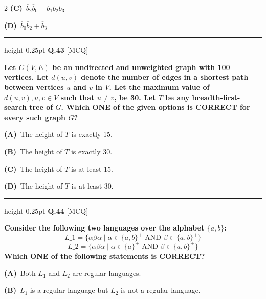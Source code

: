 \documentclass[a4paper,10pt,twoside]{article}
\begin{document}
\begin{multicols}{2}
\textbf{(C)}~$\overline{b}_2\overline{b}_0 + b_1b_2b_3$\par\vspace{2pt}\noindent
\textbf{(D)}~$\overline{b}_0\overline{b}_2 + \overline{b}_3$
\par\vspace{6pt}\hrule height 0.25pt\vspace{6pt}
\noindent\textbf{Q.43} \hfill {\footnotesize\textsf{[MCQ]}}
\par\vspace{2pt}
{\bfseries Let $G(V, E)$ be an undirected and unweighted graph with 100 vertices. Let $d(u, v)$ denote the number of edges in a shortest path between vertices $u$ and $v$ in $V$. Let the maximum value of $d(u, v), u, v \in V$ such that $u \neq v$, be 30. Let $T$ be any breadth-first-search tree of $G$. Which ONE of the given options is CORRECT for every such graph $G$? \par}
\par\vspace{2pt}\noindent
\textbf{(A)}~The height of $T$ is exactly 15.\par\vspace{2pt}\noindent
\textbf{(B)}~The height of $T$ is exactly 30.\par\vspace{2pt}\noindent
\textbf{(C)}~The height of $T$ is at least 15.\par\vspace{2pt}\noindent
\textbf{(D)}~The height of $T$ is at least 30.
\par\vspace{6pt}\hrule height 0.25pt\vspace{6pt}
\noindent\textbf{Q.44} \hfill {\footnotesize\textsf{[MCQ]}}
\par\vspace{2pt}
{\bfseries Consider the following two languages over the alphabet $\{a, b\}$:
\[ L\_1 = \{ \alpha\beta\alpha \mid \alpha \in \{a, b\}^+ \text{ AND } \beta \in \{a, b\}^+ \} \]
\[ L\_2 = \{ \alpha\beta\alpha \mid \alpha \in \{a\}^+ \text{ AND } \beta \in \{a, b\}^+ \} \]
Which ONE of the following statements is CORRECT? \par}
\par\vspace{2pt}\noindent
\textbf{(A)}~Both $L_1$ and $L_2$ are regular languages.\par\vspace{2pt}\noindent
\textbf{(B)}~$L_1$ is a regular language but $L_2$ is not a regular language.\par\vspace{2pt}\noindent

\end{multicols}
\end{document}
